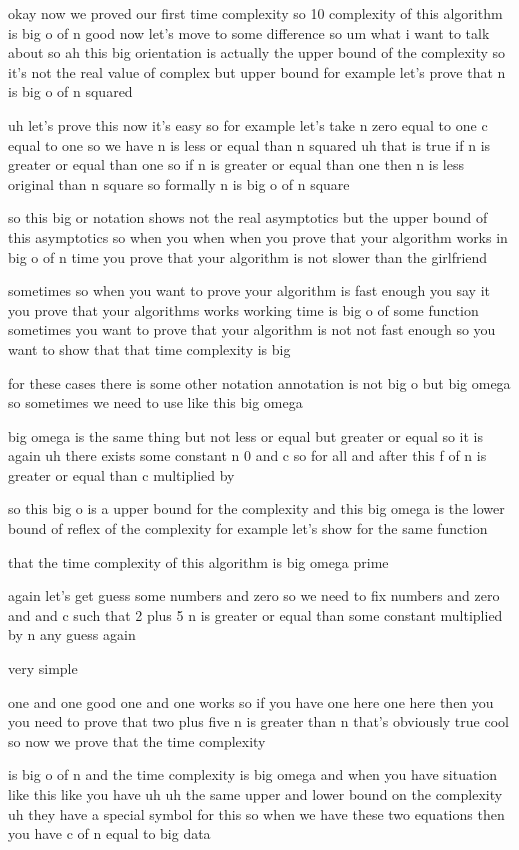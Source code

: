 okay now we proved our first time complexity so 10 complexity of this algorithm is big o of n good now let's move to some difference so um what i want to talk about so ah this big orientation is actually the upper bound of the complexity so it's not the real value of complex but upper bound for example let's prove that n is big o of n squared

uh let's prove this now it's easy so for example let's take n zero equal to one c equal to one so we have n is less or equal than n squared uh that is true if n is greater or equal than one so if n is greater or equal than one then n is less original than n square so formally n is big o of n square

so this big or notation shows not the real asymptotics but the upper bound of this asymptotics so when you when when you prove that your algorithm works in big o of n time you prove that your algorithm is not slower than the girlfriend

sometimes so when you want to prove your algorithm is fast enough you say it you prove that your algorithms works working time is big o of some function sometimes you want to prove that your algorithm is not not fast enough so you want to show that that time complexity is big

for these cases there is some other notation annotation is not big o but big omega so sometimes we need to use like this big omega

big omega is the same thing but not less or equal but greater or equal so it is again uh there exists some constant n 0 and c so for all and after this f of n is greater or equal than c multiplied by

so this big o is a upper bound for the complexity and this big omega is the lower bound of reflex of the complexity for example let's show for the same function

that the time complexity of this algorithm is big omega prime

again let's get guess some numbers and zero so we need to fix numbers and zero and and c such that 2 plus 5 n is greater or equal than some constant multiplied by n any guess again

very simple

one and one good one and one works so if you have one here one here then you you need to prove that two plus five n is greater than n that's obviously true cool so now we prove that the time complexity

is big o of n and the time complexity is big omega and when you have situation like this like you have uh uh the same upper and lower bound on the complexity uh they have a special symbol for this so when we have these two equations then you have c of n equal to big data

